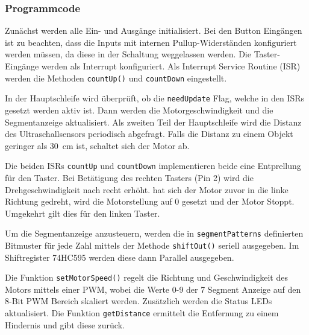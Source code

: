 \newpage
\subsubsection{Programmcode}



Zunächst werden alle Ein- und Ausgänge initialisiert. Bei den Button Eingängen ist zu beachten, dass die Inputs mit internen Pullup-Widerständen konfiguriert werden müssen, da diese in der Schaltung weggelassen werden. Die Taster-Eingänge werden als Interrupt konfiguriert. Als Interrupt Service Routine (ISR) werden die Methoden \lstinline!countUp()! und \lstinline!countDown! eingestellt.



In der Hauptschleife wird überprüft, ob die \lstinline!needUpdate! Flag, welche in den ISRs gesetzt werden aktiv ist. Dann werden die Motorgeschwindigkeit und die Segmentanzeige aktualisiert. Als zweiten Teil der Hauptschleife wird die Distanz des Ultraschallsensors periodisch abgefragt. Falls die Distanz zu einem Objekt geringer als \SI{30}{\centi\meter} ist, schaltet sich der Motor ab.



Die beiden ISRs \lstinline!countUp! und \lstinline!countDown! implementieren beide eine Entprellung für den Taster. Bei Betätigung des rechten Tasters (Pin 2) wird die Drehgeschwindigkeit nach recht erhöht. hat sich der Motor zuvor in die linke Richtung gedreht, wird die Motorstellung auf 0 gesetzt und der Motor Stoppt. Umgekehrt gilt dies für den linken Taster.

Um die Segmentanzeige anzusteuern, werden die in \lstinline!segmentPatterns! definierten Bitmuster für jede Zahl mittels der Methode \lstinline!shiftOut()! seriell ausgegeben. Im Shiftregister 74HC595 werden diese dann Parallel ausgegeben.



Die Funktion \lstinline!setMotorSpeed()! regelt die Richtung und Geschwindigkeit des Motors mittels einer PWM, wobei die Werte 0-9 der 7 Segment Anzeige auf den 8-Bit PWM Bereich skaliert werden. Zusätzlich werden die Status LEDs aktualisiert. Die Funktion \lstinline!getDistance! ermittelt die Entfernung zu einem Hindernis und gibt diese zurück.
